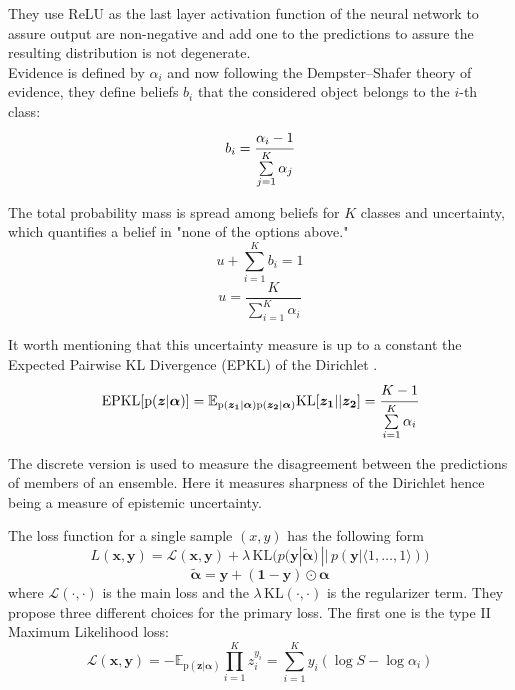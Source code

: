 \documentclass{article}
\begin{document}
They use ReLU as the last layer activation function of the neural network to assure output are non-negative and add one to the predictions to assure the resulting distribution is not degenerate.\\
Evidence is defined by $\alpha_i$ and now following the Dempster–Shafer theory of evidence, they define beliefs $b_i$ that the considered object belongs to the $i$-th class:
\begin{equation}
b_i = \cfrac{\alpha_i - 1}{\sum\limits_{j=1}^K \alpha_j}
\end{equation}

The total probability mass is spread among beliefs for $K$ classes and uncertainty, which quantifies a belief in "none of the options above."
\begin{equation}
u + \sum_{i=1}^K b_i = 1
\end{equation}
\begin{equation}
u = \frac{K}{\sum_{i=1}^K \alpha_i}
\end{equation}

It worth mentioning that this uncertainty measure is up to a constant the Expected Pairwise KL Divergence (EPKL) of the Dirichlet \cite{andrey_phd}.
\begin{equation}
\mathrm{EPKL} [\mathrm{p} (\boldsymbol{z} | \boldsymbol{\alpha})] = \mathbb{E}_{ \mathrm{p} (\boldsymbol{z_1} | \boldsymbol{\alpha}) \mathrm{p} (\boldsymbol{z_2} | \boldsymbol{\alpha})} \mathrm{KL} [ \boldsymbol{z_1} || \boldsymbol{z_2} ] = \cfrac{K - 1}{\sum\limits_{i=1}^K \alpha_i}
\end{equation}

The discrete version is used to measure the disagreement between the predictions of members of an ensemble.
Here it measures sharpness of the Dirichlet hence being a measure of epistemic uncertainty.

The loss function for a single sample $(x, y)$ has the following form
\begin{equation}
L(\boldsymbol{x}, \boldsymbol{y}) = \mathcal{L}(\boldsymbol{x}, \boldsymbol{y}) + \lambda \, \mathrm{KL} \Big( p(\boldsymbol{y} | \tilde{\boldsymbol{\alpha}}) \, || \, p(\boldsymbol{y} | \langle 1, \dots, 1 \rangle) \Big)
\end{equation}
\begin{equation}
\tilde{\boldsymbol{\alpha}} = \boldsymbol{y} + (\boldsymbol{1 - y}) \odot \boldsymbol{\alpha}
\end{equation}
where $\mathcal{L}(\cdot, \cdot)$ is the main loss and the $\lambda \, \mathrm{KL} (\cdot, \cdot)$ is the regularizer term.
They propose three different choices for the primary loss.
The first one is the type II Maximum Likelihood loss:
\begin{equation}
\mathcal{L}(\boldsymbol{x}, \boldsymbol{y}) = -\mathbb{E}_{\mathrm{p}(\boldsymbol{z} | \boldsymbol{\alpha})} \prod_{i=1}^K z_i^{y_i} = \sum_{i=1}^K y_i (\log S - \log \alpha_i)
\end{equation}
\end{document}
